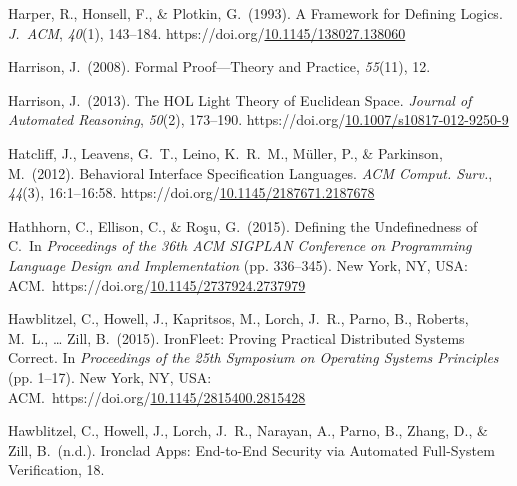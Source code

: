 \documentclass[12pt,twoside]{article}
\begin{document}
{\begin{thebibliography}{222}
\mdbibitemlabel{}Harper, R., Honsell, F., \& Plotkin, G.~(1993). A Framework for Defining Logics. \emph{J.~ACM}, \emph{40}(1), 143–184. https://doi.org/\href{https://dx.doi.org/10.1145/138027.138060}{10.1145/138027.138060}\label{harper_framework_1993}%

\mdbibitemlabel{}Harrison, J.~(2008). Formal Proof—Theory and Practice, \emph{55}(11), 12.\label{harrison_formal_2008}%

\mdbibitemlabel{}Harrison, J.~(2013). The HOL Light Theory of Euclidean Space. \emph{Journal of Automated Reasoning}, \emph{50}(2), 173–190. https://doi.org/\href{https://dx.doi.org/10.1007/s10817-012-9250-9}{10.1007/s10817-012-9250-9}\label{harrison_hol_2013}%

\mdbibitemlabel{}Hatcliff, J., Leavens, G.~T., Leino, K.~R.~M., Müller, P., \& Parkinson, M.~(2012). Behavioral Interface Specification Languages. \emph{ACM Comput. Surv.}, \emph{44}(3), 16:1–16:58. https://doi.org/\href{https://dx.doi.org/10.1145/2187671.2187678}{10.1145/2187671.2187678}\label{hatcliff_behavioral_2012}%

\mdbibitemlabel{}Hathhorn, C., Ellison, C., \& Roşu, G.~(2015). Defining the Undefinedness of C.~In \emph{Proceedings of the 36th ACM SIGPLAN Conference on Programming Language Design and Implementation} (pp. 336–345). New York, NY, USA: ACM.~https://doi.org/\href{https://dx.doi.org/10.1145/2737924.2737979}{10.1145/2737924.2737979}\label{hathhorn_defining_2015}%

\mdbibitemlabel{}Hawblitzel, C., Howell, J., Kapritsos, M., Lorch, J.~R., Parno, B., Roberts, M.~L., … Zill, B.~(2015). IronFleet: Proving Practical Distributed Systems Correct. In \emph{Proceedings of the 25th Symposium on Operating Systems Principles} (pp. 1–17). New York, NY, USA: ACM.~https://doi.org/\href{https://dx.doi.org/10.1145/2815400.2815428}{10.1145/2815400.2815428}\label{hawblitzel_ironfleet:_2015}%

\mdbibitemlabel{}Hawblitzel, C., Howell, J., Lorch, J.~R., Narayan, A., Parno, B., Zhang, D., \& Zill, B.~(n.d.). Ironclad Apps: End-to-End Security via Automated Full-System Veriﬁcation, 18.\label{hawblitzel_ironclad_nodate}%


\end{thebibliography}}
\end{document}
